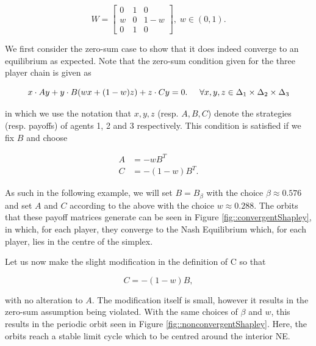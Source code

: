 \documentclass{article}
\theoremstyle{definition}
\begin{document}
	\begin{equation}
		W = \begin{bmatrix}
			0 & 1 & 0 \\
			w & 0 & 1 - w \\
			0 & 1 & 0
		\end{bmatrix}, \; w \in (0, 1).
	\end{equation}


	We first consider the zero-sum case to show that it does indeed converge to an equilibrium as expected. Note that the zero-sum condition given for the three player chain is given as

	\begin{equation}
		x \cdot A y + y \cdot B (w x + (1-w)z) + z \cdot C y = 0. \hspace{0.5cm} \forall x, y, z \in \Delta_1 \times \Delta_2 \times \Delta_3
	\end{equation}

	in which we use the notation that $x, y, z$ (resp. $A, B, C$) denote the strategies (resp. payoffs) of agents 1, 2 and 3 respectively. This condition is satisfied if we fix $B$ and choose

	\begin{align}
		A & = - w B^T \\
		C & = - (1 - w) B^T. 
	\end{align}

	As such in the following example, we will set $B = B_\beta$ with the choice $\beta \approx 0.576$ and set $A$ and $C$ according to the above with the choice $w \approx 0.288$. The orbits that these payoff matrices generate can be seen in Figure \ref{fig::convergentShapley}, in which, for each player, they converge to the Nash Equilibrium which, for each player, lies in the centre of the simplex.

	Let us now make the slight modification in the definition of C so that

	\begin{equation}
		C  = - (1 - w) B, 
	\end{equation}

	with no alteration to $A$. The modification itself is small, however it results in the zero-sum assumption being violated. With the same choices of $\beta$ and $w$, this results in the periodic orbit seen in Figure \ref{fig::nonconvergentShapley}. Here, the orbits reach a stable limit cycle which to be centred around the interior NE.
\end{document}
